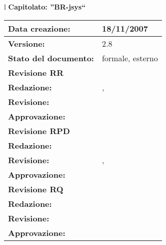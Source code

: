 

\newcommand{\lv}{2.8} %
\newcommand{\dt}{ Analisi Dei Requisiti }%


\begin{center}
\thispagestyle{plain}
\begin{table}[htbp]
\large{
\begin{tabular}{l}
\Large{\textbf{\textsf{Capitolato: ''BR-jsys``}}} \\
\begin{tabular}{|p{6cm}|p{6cm}|} \hline
\textbf{Data creazione:} & 18/11/2007 \\ \hline
\textbf{Versione:} & \lv \\ \hline
\textbf{Stato del documento:} & formale, esterno \\ \hline
\textbf{Revisione RR} &   \\ \hline
\textbf{Redazione:} & \MB, \AT \\ \hline
\textbf{Revisione:} &   \MT \\ \hline
\textbf{Approvazione:}  & \ET \\ \hline
\textbf{Revisione RPD} &  \\ \hline 
\textbf{Redazione:} & \MT \\ \hline
\textbf{Revisione:} &  \AT, \MB \\ \hline
\textbf{Approvazione:}  & \ET \\ \hline
\textbf{Revisione RQ} &   \\ \hline
\textbf{Redazione:} & \ET \\ \hline
\textbf{Revisione:} & \\ \hline
\textbf{Approvazione:}  & \\ \hline

\end{tabular} \\
\end{tabular}
}
\end{table}


\end{center}
